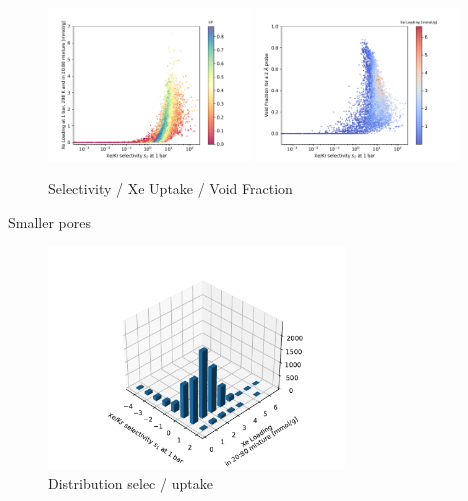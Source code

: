 \documentclass[main.tex]{subfiles}
\begin{document}
\begin{figure}[ht]
  \centering
  \includegraphics[width=0.48\textwidth]{figures/2-thermo/Scatterplot_uptake_selectivity_vol.pdf}
  \includegraphics[width=0.48\textwidth]{figures/2-thermo/Scatterplot_vol_selectivity.pdf}
  \caption{Selectivity / Xe Uptake / Void Fraction }\label{fgr:vol}
\end{figure}


Smaller pores

\begin{figure}[ht]
  \centering
  \includegraphics[width=0.7\textwidth]{figures/2-thermo/3D_hist_selec_uptake.pdf}
  \caption{Distribution selec / uptake }
\end{figure}
\end{document}
